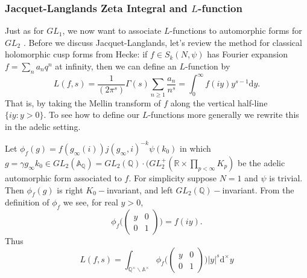 \documentclass[12pt,a4paper,english]{article}
\theoremstyle{plain}
\theoremstyle{definition}
\begin{document}
\subsubsection{Jacquet-Langlands Zeta Integral and $L$-function}
Just as  for $GL_{1}$, we now want to associate $L$-functions to automorphic forms for $GL_{2}$ \cite{langlands1970automorphic}. Before we discuss Jacquet-Langlands, let's review the method for classical holomorphic cusp forms from Hecke: if $f\in S_{k}(N, \psi)$ has Fourier expansion $f=\sum_{n}a_{n}q^{n}$ at infinity, then we can define an $L$-function by 
\begin{equation*}
    L(f,s)=\frac{1}{(2\pi^{s})}\Gamma(s)\sum_{n\geq 1}\frac{a_{n}}{n^{s}}=\int^{\infty}_{0}f(iy)y^{s-1}
    \text{d}y.
\end{equation*}
That is, by taking the Mellin transform of $f$ along the vertical half-line $\{iy:y>0\}$. To see how to define our $L$-functions more generally we rewrite this in the adelic setting.

Let $\phi_{f}(g)=f(g_{\infty}(i))j(g_{\infty},i)^{-k}\psi(k_{0})$ in which $g=\gamma g_{\infty}k_{0}\in GL_{2}(\mathbb{A}_{\mathbb{Q}})= GL_{2}(\mathbb{Q})\cdot (GL^{+}_{2}(\mathbb{R}\times \prod_{p<\infty}K_{p})$ be the adelic automorphic form associated to $f$. For simplicity suppose $N=1$ and $\psi$ is trivial. Then $\phi_{f}(g)$ is right $K_{0}-$invariant, and left $GL_{2}(\mathbb{Q})-$invariant. From the definition of $\phi_{f}$ we see, for real $y>0$,
\begin{equation*}
    \phi_{f}\bigg(\begin{pmatrix}
    y&0\\
    0&1
    \end{pmatrix}\bigg)=f(iy).
\end{equation*}
Thus
\begin{equation*}
    L(f,s)=\int_{\mathbb{Q^{\times}}\backslash\mathbb{A}^{\times}}\phi_{f}\bigg(\begin{pmatrix}
    y&0\\
    0&1
    \end{pmatrix}\bigg) |y|^{s}\text{d}^{\times}y
\end{equation*}
\end{document}
